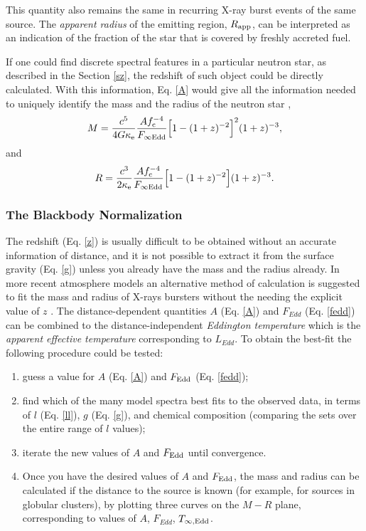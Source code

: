 {\quad

This quantity also remains the same in recurring X-ray burst events of the same source. The {\it apparent radius} of the emitting region, $R_{\rm app}$,  can be interpreted as an indication of the fraction of the star that is covered by freshly accreted fuel.


\quad

If one could find discrete spectral features in a particular neutron star, as described in the Section \ref{sz}, the redshift of such object could be directly calculated. With this information,  Eq. \ref{A} would give all the information needed to uniquely identify  the mass and the radius of the neutron star \cite{LM07},
\begin{equation*}
M = \frac{c^5}{4G\kappa_{\rm e}} \frac{Af_{\rm c}^{-4}}{F_{\infty \rm Edd}} \Big[ 1 - (1+z)^{-2}\Big]^2 (1+z)^{-3},
\label{mlat}
\end{equation*}
and
\begin{equation*}
R = \frac{c^3}{2 \kappa_{\rm e}} \frac{ Af_{\rm c}^{-4} }{F_{\infty \rm Edd} }\Big [ 1 - (1+z)^{-2}\Big](1+z)^{-3}.
\label{rlat}
\end{equation*}

\quad 




\subsubsection*{The Blackbody Normalization}\label{sK}


The  redshift (Eq. \ref{z}) is usually difficult to be obtained without an accurate information of distance, and it is not possible to extract it from the surface gravity (Eq. \ref{g}) unless you already have the mass and the radius already. In more recent atmosphere models an alternative method of calculation is  suggested to fit the mass and radius of X-rays bursters without the needing the explicit value of $z$ \cite{SPW10}.  The distance-dependent quantities $A$ (Eq. \ref{A}) and $F_{Edd}$ (Eq. \ref{fedd}) can be combined to the distance-independent {\it Eddington temperature} which is the {\it apparent effective temperature} corresponding to $L_{Edd}$. To obtain the best-fit the following procedure could be tested:
\begin{enumerate}
\item guess a value for $A$ (Eq. \ref{A}) and $F_{\rm Edd}$ (Eq. \ref{fedd});
\item find which of the many model spectra best fits to the observed data, in terms of $l$ (Eq. \ref{ll}), $g$ (Eq. \ref{g}), and chemical composition (comparing the sets over the entire range of $l$ values);\item iterate the new values of $A$ and $F_{\rm Edd}$ until convergence.
\item Once you have the desired values of $A$ and $F_{\rm Edd}$, the mass and radius can be calculated if the distance to the source is known (for example, for sources in globular clusters), by plotting  three curves on the $M-R$ plane, corresponding to values of $A$, $F_{Edd}$, $T_{\infty, \rm  Edd}$.
\end{enumerate}


}
